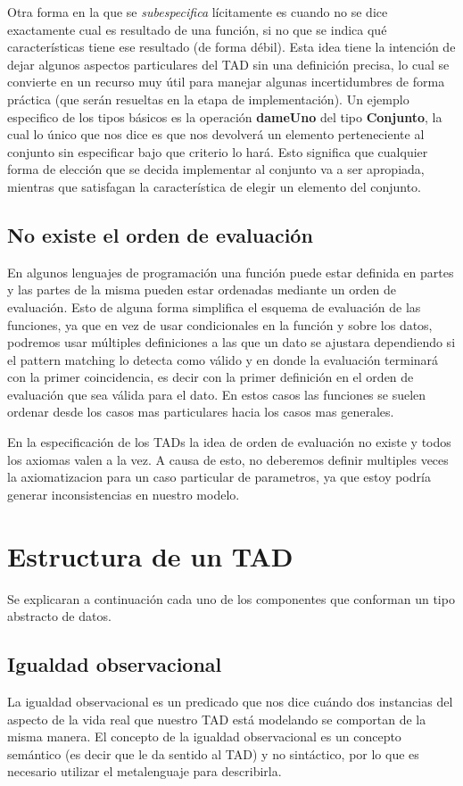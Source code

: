 Otra forma en la que se \textit{subespecifica} l\'icitamente es cuando no se dice exactamente cual es resultado de una funci\'on, si no que se indica qu\'e caracter\'isticas tiene ese resultado (de forma d\'ebil). Esta idea tiene la intenci\'on de dejar algunos aspectos particulares del TAD sin una definici\'on precisa, lo cual se convierte en un recurso muy \'util para manejar algunas incertidumbres de forma pr\'actica (que ser\'an resueltas en la etapa de implementaci\'on).
Un ejemplo especifico de los tipos b\'asicos es la operaci\'on \textbf{dameUno} del tipo \textbf{Conjunto}, la cual lo \'unico que nos dice es que nos devolver\'a un elemento perteneciente al conjunto sin especificar bajo que criterio lo har\'a. Esto significa que cualquier forma de elecci\'on que se decida implementar al conjunto va a ser apropiada, mientras que satisfagan la caracter\'istica de elegir un elemento del conjunto.

\subsection{No existe el orden de evaluaci\'on}
En algunos lenguajes de programaci\'on una funci\'on puede estar definida en partes y las partes de la misma pueden estar ordenadas mediante un orden de evaluaci\'on. Esto de alguna forma simplifica el esquema de evaluaci\'on de las funciones, ya que en vez de usar condicionales en la funci\'on y sobre los datos, podremos usar m\'ultiples definiciones a las que un dato se ajustara dependiendo si el pattern matching lo detecta como v\'alido y en donde la evaluaci\'on terminar\'a con la primer coincidencia, es decir con la primer definici\'on en el orden de evaluaci\'on que sea v\'alida para el dato. En estos casos las funciones se suelen ordenar desde los casos mas particulares hacia los casos mas generales.

En la especificaci\'on de los TADs la idea de orden de evaluaci\'on no existe y todos los axiomas valen a la vez. A causa de esto, no deberemos definir multiples veces la axiomatizacion para un caso particular de parametros, ya que estoy podr\'ia generar inconsistencias en nuestro modelo.

\newpage
\section{Estructura de un TAD}
Se explicaran a continuaci\'on cada uno de los componentes que conforman un tipo abstracto de datos.


\subsection{Igualdad observacional}
La igualdad observacional es un predicado que nos dice cu\'ando dos instancias del aspecto de la vida real que nuestro TAD est\'a modelando se comportan de la misma manera. El concepto de la igualdad observacional es un concepto sem\'antico (es decir que le da sentido al TAD) y no sint\'actico, por lo que es necesario utilizar el metalenguaje para describirla.

